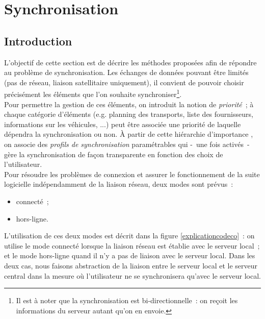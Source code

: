 \section{Synchronisation}\label{SynchronisationTechnique}
\label{Architecture_technique_de_synchronisation}

\subsection{Introduction}
L'objectif de cette section est de décrire les méthodes proposées afin de répondre au problème de synchronisation.
Les échanges de données pouvant être limités (pas de réseau, liaison satellitaire uniquement), il convient de pouvoir choisir précisément les éléments que l'on souhaite synchroniser\footnote{Il est à noter que la synchronisation est bi-directionnelle~: on reçoit les informations du serveur autant qu'on en envoie.}.
\\
Pour permettre la gestion de ces éléments, on introduit la notion de \emph{priorité}~; à chaque catégorie d'éléments (e.g. planning des transports, liste des fournisseurs, informations sur les véhicules, ...) peut être associée une priorité de laquelle dépendra la synchronisation ou non.
À partir de cette \og hiérarchie d'importance \fg{}, on associe des \emph{profils de synchronisation} paramétrables qui -~une fois activés~- gère la synchronisation de façon transparente en fonction des choix de l'utilisateur.
\\
Pour résoudre les problèmes de connexion et assurer le fonctionnement de la suite logicielle indépendamment de la liaison réseau, deux modes sont prévus~:
\begin{itemize}
    \item connecté~;
    \item hors-ligne.
\end{itemize}
L'utilisation de ces deux modes est décrit dans la figure \ref{explicationcodeco}~: on utilise le mode connecté lorsque la liaison réseau est établie avec le serveur local~; et le mode hors-ligne quand il n'y a pas de liaison avec le serveur local.
Dans les deux cas, nous faisons abstraction de la liaison entre le serveur local et le serveur central dans la mesure où l'utilisateur ne se synchronisera qu'avec le serveur local.
